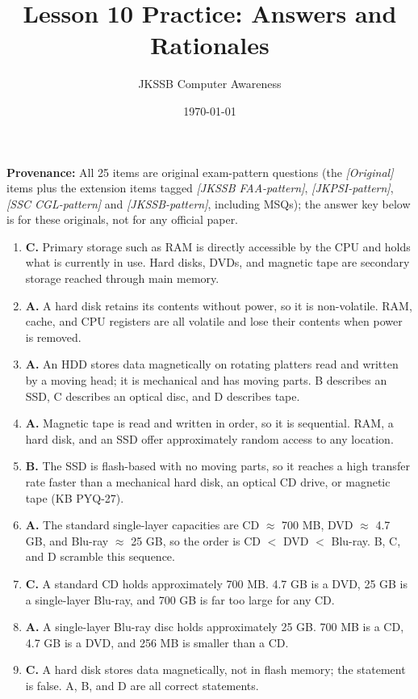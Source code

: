 \documentclass[11pt]{article}
\title{Lesson 10 Practice: Answers and Rationales}
\author{JKSSB Computer Awareness}
\date{\today}
\begin{document}
\maketitle
\noindent\textbf{Provenance:} All 25 items are original exam-pattern questions (the \textit{[Original]} items plus the extension items tagged \textit{[JKSSB FAA-pattern]}, \textit{[JKPSI-pattern]}, \textit{[SSC CGL-pattern]} and \textit{[JKSSB-pattern]}, including MSQs); the answer key below is for these originals, not for any official paper.

\begin{enumerate}[label=\textbf{Q\arabic*.}, leftmargin=*]
\item \textbf{C.} Primary storage such as RAM is directly accessible by the
  CPU and holds what is currently in use. Hard disks, DVDs, and magnetic tape
  are secondary storage reached through main memory.
\item \textbf{A.} A hard disk retains its contents without power, so it is
  non-volatile. RAM, cache, and CPU registers are all volatile and lose their
  contents when power is removed.
\item \textbf{A.} An HDD stores data magnetically on rotating platters read
  and written by a moving head; it is mechanical and has moving parts. B
  describes an SSD, C describes an optical disc, and D describes tape.
\item \textbf{A.} Magnetic tape is read and written in order, so it is
  sequential. RAM, a hard disk, and an SSD offer approximately random access
  to any location.
\item \textbf{B.} The SSD is flash-based with no moving parts, so it reaches
  a high transfer rate faster than a mechanical hard disk, an optical CD
  drive, or magnetic tape (KB PYQ-27).
\item \textbf{A.} The standard single-layer capacities are CD $\approx$
  700 MB, DVD $\approx$ 4.7 GB, and Blu-ray $\approx$ 25 GB, so the order is
  CD $<$ DVD $<$ Blu-ray. B, C, and D scramble this sequence.
\item \textbf{C.} A standard CD holds approximately 700 MB. 4.7 GB is a DVD,
  25 GB is a single-layer Blu-ray, and 700 GB is far too large for any CD.
\item \textbf{A.} A single-layer Blu-ray disc holds approximately 25 GB.
  700 MB is a CD, 4.7 GB is a DVD, and 256 MB is smaller than a CD.
\item \textbf{C.} A hard disk stores data magnetically, not in flash memory;
  the statement is false. A, B, and D are all correct statements.

\end{enumerate}
\end{document}
